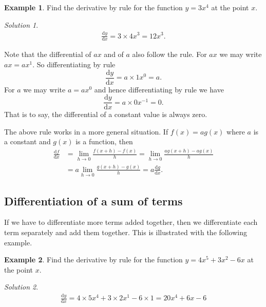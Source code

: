\documentclass[
  11pt,
  oneside]{book}
\newcommand{\slide}{}
\theoremstyle{definition}
\theoremstyle{definition}
\newtheorem{example}{Example}[chapter]
\theoremstyle{definition}
\theoremstyle{definition}
\theoremstyle{remark}
\newtheorem*{solution}{Solution}
\begin{document}
\begin{example}
Find the derivative by rule for the function \(y = 3x^4\) at the point \(x\).
\end{example}

\begin{solution}
\begin{gather*}
\frac{\mathrm{d} y}{\mathrm{d} x} = 3\times4x^3 = 12 x^3.
\end{gather*}
\end{solution}

\slide

Note that the differential of \(ax\) and of \(a\) also follow the rule. For \(ax\) we may write \(ax = ax^1\). So differentiating by rule
\[
\frac{\mathrm{d} y}{\mathrm{d} x} = a\times1x^0 = a.
\]
For \(a\) we may write \(a = ax^0\) and hence differentiating by rule we have
\[
\frac{\mathrm{d} y}{\mathrm{d} x} = a\times0x^{-1} = 0.
\]
That is to say, the differential of a constant value is always zero.

\slide

The above rule works in a more general situation. If \(f(x) = ag(x)\) where \(a\) is a constant and \(g(x)\) is a function, then
\begin{align*}
\frac{\mathrm{d} f}{\mathrm{d} x} &= \lim\limits_{h\to0}\frac{f(x+h)-f(x)}{h} = \lim\limits_{h\to0}\frac{ag(x+h)-ag(x)}{h} \\ &= a\lim\limits_{h\to0}\frac{g(x+h)-g(x)}{h} = a\frac{\mathrm{d} g}{\mathrm{d} x}.
\end{align*}

\slide

\subsection{Differentiation of a sum of terms}\label{differentiation-of-a-sum-of-terms}

If we have to differentiate more terms added together, then we differentiate each term separately and add them together. This is illustrated with the following example.

\begin{example}
Find the derivative by rule for the function \(y = 4x^5+3x^2-6x\) at the point \(x\).
\end{example}

\begin{solution}
\begin{gather*}
\frac{\mathrm{d} y}{\mathrm{d} x} = 4\times5x^4 + 3\times 2x^1 - 6\times1 = 20x^4+6x-6
\end{gather*}
\end{solution}
\end{document}
